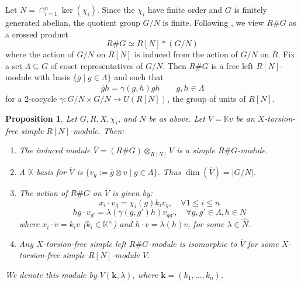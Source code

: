 \documentclass[11pt, twoside]{amsart}
\newtheorem{proposition}[theorem]{Proposition}
\theoremstyle{definition}
\newcommand{\KK}{\mathbb{K}}
\begin{document}
%
Let $N = \cap_{i=1}^{n}\ker(\chi_i)$. Since the $\chi_i$ have finite order and $G$ is finitely generated abelian, the quotient group $G/N$ is finite. Following \cite[Lemma 1.3]{Passman}, we view $R\# G$ as a crossed product
%
\[R\# G \simeq R[N]*(G/N)\]
%
where the action of $G/N$ on $R[N]$ is induced from the action of $G/N$ on $R$. Fix a set $\Lambda \subseteq G$ of coset representatives of $G/N$. Then $R\# G$ is a free left $R[N]$-module with basis $\{\overline{g} \mid g \in \Lambda\}$ and such that 
%
\[\overline{g}\overline{h} = \gamma(g, h)\overline{gh} \qquad g,h\in\Lambda\]
%
for a 2-cocycle $\gamma: G/N \times G/N \to U(R[N])$, the group of units of $R[N]$.
%
\begin{proposition}\label{proposition:torsionfree simples over general skew group ring}
    Let $G, R, X, \chi_i$, and $N$ be as above. Let $V = \KK v$ be an $X$-torsion-free simple $R[N]$-module. Then:
    \begin{enumerate}
        \item The induced module $\overline{V} = (R\# G) \otimes_{R[N]}V$ is a simple $R\# G$-module. 
        \item A $\KK$-basis for $\overline{V}$ is $\{v_g := \overline{g}\otimes v \mid  g \in \Lambda\}$. Thus $\dim(\overline{V}) = |G/N|$. 
        \item The action of $R\# G$ on $\overline{V}$ is given by:
        \[x_i \cdot v_g = \chi_{i}(g)k_i v_g, \quad \forall 1 \leq i \leq n\]
        \[hg\cdot v_{g'} = \lambda(\gamma(g, g')h)v_{gg'}, \quad \forall g, g' \in \Lambda, h \in N\]
        where $x_i \cdot v = k_i v$ ($k_i \in \KK^\times$) and $h\cdot v = \lambda(h)v$, for some $\lambda \in \widehat{N}$. 
        \item Any $X$-torsion-free simple left $R\# G$-module is isomorphic to $\overline{V}$ for some $X$-torsion-free simple $R[N]$-module $V$.
    \end{enumerate}
    We denote this module by $V(\mathbf{k}, \lambda)$, where $\mathbf{k} = (k_1, \ldots, k_n)$.
\end{proposition}
\end{document}
